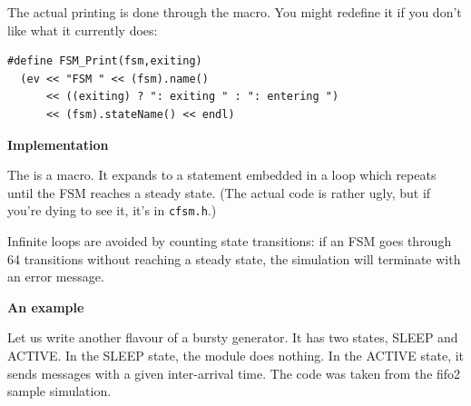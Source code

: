 The actual printing is done through the  macro. You 
might redefine it if you don't like what it currently does:


\begin{Verbatim}
#define FSM_Print(fsm,exiting)
  (ev << "FSM " << (fsm).name()
      << ((exiting) ? ": exiting " : ": entering ")
      << (fsm).stateName() << endl)
\end{Verbatim}
  

\textbf{Implementation}


The  is a macro. It expands to a 
statement embedded in a  loop which repeats until the
FSM reaches a steady state. (The actual code is rather
ugly, but if you're dying to see it, it's in \texttt{cfsm.h}.)

Infinite loops are avoided by counting state transitions: if 
an FSM goes through 64 transitions without reaching a steady 
state, the simulation will terminate with an error message.


\textbf{An example}


Let us write another flavour of a bursty generator. It has two 
states, SLEEP and ACTIVE. In the SLEEP state, the module does 
nothing. In the ACTIVE state, it sends messages with a given 
inter-arrival time. The code was taken from the fifo2 sample 
simulation.


